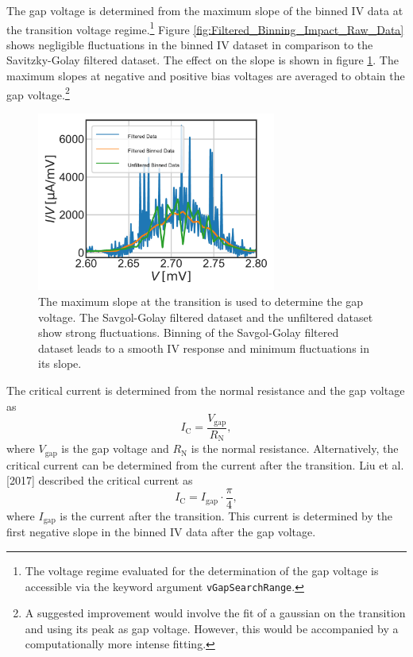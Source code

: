 \documentclass[]{article}
\begin{document}
The gap voltage is determined from the maximum slope of the binned IV data at the transition voltage regime.\footnote{The voltage regime evaluated for the determination of the gap voltage is accessible via the keyword argument \texttt{vGapSearchRange}.} Figure \ref{fig:Filtered_Binning_Impact_Raw_Data} shows negligible fluctuations in the binned IV dataset in comparison to the Savitzky-Golay filtered dataset. The effect on the slope is shown in figure \ref{fig:Filtered_Binning_Impact_Slope_Transission}. The maximum slopes at negative and positive bias voltages are averaged to obtain the gap voltage.\footnote{A suggested improvement would involve the fit of a gaussian on the transition and using its peak as gap voltage. However, this would be accompanied by a computationally more intense fitting. } 

\begin{figure}
	\centering
	\includegraphics[width=0.7\textwidth]{./../IV_Class_Unit_Test/2020_01_14/Filtered_Binning_Impact_Slope_Transission.pdf}
	\caption{The maximum slope at the transition is used to determine the gap voltage. The Savgol-Golay filtered dataset and the unfiltered dataset show strong fluctuations. Binning of the Savgol-Golay filtered dataset leads to a smooth IV response and minimum fluctuations in its slope.}
	\label{fig:Filtered_Binning_Impact_Slope_Transission}
\end{figure}

The critical current is determined from the normal resistance and the gap voltage as
\begin{equation}
	I_\text{C} = \frac{V_\text{gap}}{R_\text{N}},
\end{equation}
where $V_\text{gap}$ is the gap voltage and $R_\text{N}$ is the normal resistance. 
Alternatively, the critical current can be determined from the current after the transition. Liu et al. [2017] described the critical current as
\begin{equation}
I_\text{C} = I_\text{gap}\cdot\frac{\pi}{4},
\end{equation}
where $I_\text{gap}$ is the current after the transition. This current is determined by the first negative slope in the binned IV data after the gap voltage.
\end{document}
